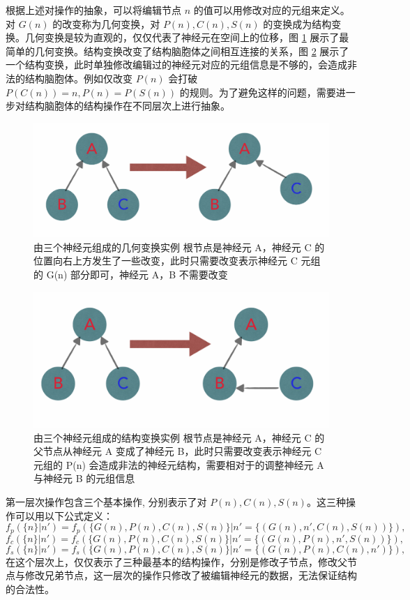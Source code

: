 根据上述对操作的抽象，可以将编辑节点 $n$ 的值可以用修改对应的元组来定义。对 $G(n)$ 的改变称为几何变换，对 $P(n), C(n), S(n)$ 的变换成为结构变换。几何变换是较为直观的，仅仅代表了神经元在空间上的位移，图 \ref{gem} 展示了最简单的几何变换。结构变换改变了结构脑胞体之间相互连接的关系，图 \ref{stru} 展示了一个结构变换，此时单独修改编辑过的神经元对应的元组信息是不够的，会造成非法的结构脑胞体。例如仅改变 $P(n)$ 会打破 $P(C(n)) = n, P(n) = P(S(n))$ 的规则。为了避免这样的问题，需要进一步对结构脑胞体的结构操作在不同层次上进行抽象。

\begin{figure}[!ht]
\centering
\includegraphics[width=148mm]{images/gem}
\caption{由三个神经元组成的几何变换实例 根节点是神经元 A，神经元 C 的位置向右上方发生了一些改变，此时只需要改变表示神经元 C 元组的 G(n) 部分即可，神经元 A，B 不需要改变}
\label{gem}
\end{figure}

\begin{figure}[!ht]
\centering
\includegraphics[width=148mm]{images/stru}
\caption{由三个神经元组成的结构变换实例 根节点是神经元 A，神经元 C 的
父节点从神经元 A 变成了神经元 B，此时只需要改变表示神经元 C 元组的 P(n) 会造成非法的神经元结构，需要相对于的调整神经元 A 与神经元 B 的元组信息}
\label{stru}
\end{figure}

第一层次操作包含三个基本操作, 分别表示了对 $P(n), C(n), S(n)$。这三种操作可以用以下公式定义：
$$f_p(\{n\}|n') = f_p(\{G(n), P(n), C(n), S(n)\}|n' = \{(G(n), n', C(n), S(n))\}),$$
$$f_c(\{n\}|n') = f_c(\{G(n), P(n), C(n), S(n)\}|n' = \{(G(n), P(n), n', S(n))\}),$$
$$f_s(\{n\}|n') = f_s(\{G(n), P(n), C(n), S(n)\}|n' = \{(G(n), P(n), C(n), n')\}),$$
在这个层次上，仅仅表示了三种最基本的结构操作，分别是修改子节点，修改父节点与修改兄弟节点，这一层次的操作只修改了被编辑神经元的数据，无法保证结构的合法性。

